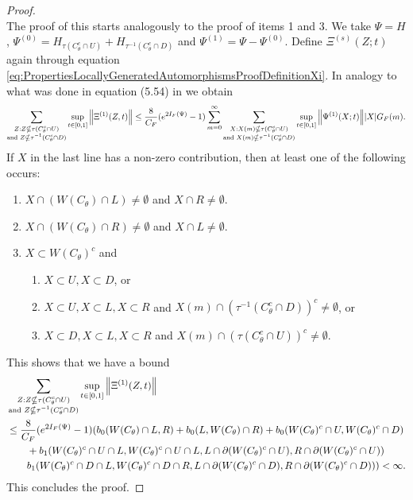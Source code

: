 \documentclass[11pt,a4paper,twoside]{article}
\numberwithin{equation}{section}
\begin{document}
\begin{proof}
\begin{equation}
		\end{equation}
		The proof of this starts analogously to the proof of items 1 and 3. We take $\Psi=H$, $\Psi^{(0)}=H_{\tau(C_\theta^c\cap U)}+H_{\tau^{-1}(C_\theta^c\cap D)}$ and $\Psi^{(1)}=\Psi-\Psi^{(0)}$. Define $\Xi^{(s)}(Z;t)$ again through equation \eqref{eq:PropertiesLocallyGeneratedAutomorphismsProofDefinitionXi}. In analogy to what was done in equation (5.54) in \cite{ogata2021h3gmathbb} we obtain
		\begin{equation}
			\sum_{\substack{Z:Z\nsubseteq \tau(C_\theta^c\cap U)\\\text{and }Z\nsubseteq \tau^{-1}(C_\theta^c\cap D)}}\sup_{t\in[0,1]}\norm{\Xi^{(1)}(Z,t)}\leq \frac{8}{C_F}(e^{2I_F(\Psi)}-1)\sum_{m=0}^\infty\sum_{\substack{X:X(m)\nsubseteq \tau(C_\theta^c\cap U)\\\text{and }X(m)\nsubseteq \tau^{-1}(C_\theta^c\cap D)}} \sup_{t\in[0,1]}\norm{\Psi^{(1)}(X;t)}\abs{X}G_F(m).
		\end{equation}
		If $X$ in the last line has a non-zero contribution, then at least one of the following occurs:
		\begin{enumerate}
			\item $X\cap (W(C_\theta)\cap L)\neq\emptyset$ and $X\cap R\neq\emptyset$.
			\item $X\cap (W(C_\theta)\cap R)\neq\emptyset$ and $X\cap L\neq\emptyset$.
			\item $X\subset W(C_\theta)^c$ and
			\begin{enumerate}
				\item $X\subset U,X\subset D$, or
				\item $X\subset U,X\subset L,X\subset R$ and $X(m)\cap (\tau^{-1}(C_\theta^c\cap D))^c\neq \emptyset$, or
				\item $X\subset D,X\subset L,X\subset R$ and $X(m)\cap (\tau(C_\theta^c\cap U))^c\neq \emptyset$.
			\end{enumerate}
		\end{enumerate}
		This shows that we have a bound
		\begin{align}
			&\sum_{\substack{Z:Z\nsubseteq \tau(C_\theta^c\cap U)\\\text{and }Z\nsubseteq \tau^{-1}(C_\theta^c\cap D)}}\sup_{t\in[0,1]}\norm{\Xi^{(1)}(Z,t)}\\
			\nonumber
			&\leq \frac{8}{C_F}(e^{2I_F(\Psi)}-1)(b_0(W(C_\theta)\cap L,R)+b_0(L,W(C_\theta)\cap R)+b_0(W(C_\theta)^c\cap U,W(C_\theta)^c\cap D)\\
			\nonumber
			&\qquad+b_1(W(C_\theta)^c\cap U\cap L,W(C_\theta)^c\cap U\cap L,L\cap\partial(W(C_\theta)^c\cap U),R\cap\partial(W(C_\theta)^c\cap U))\\
			&\qquad b_1(W(C_\theta)^c\cap D\cap L,W(C_\theta)^c\cap D\cap R,L\cap\partial(W(C_\theta)^c\cap D),R\cap\partial(W(C_\theta)^c\cap D)))<\infty.
		\end{align}
		This concludes the proof.
	\end{proof}
\end{document}
